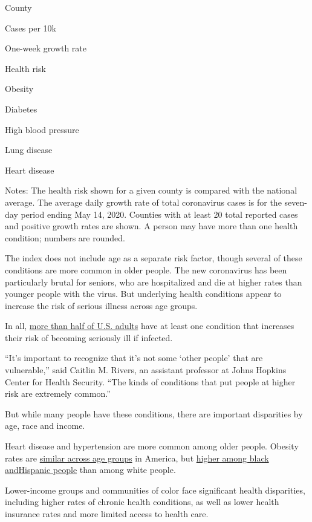 County

Cases per 10k

One-week growth rate

Health risk

Obesity

Diabetes

High blood pressure

Lung disease

Heart disease

Notes: The health risk shown for a given county is compared with the
national average. The average daily growth rate of total coronavirus
cases is for the seven-day period ending May 14, 2020. Counties with at
least 20 total reported cases and positive growth rates are shown. A
person may have more than one health condition; numbers are rounded.

The index does not include age as a separate risk factor, though several
of these conditions are more common in older people. The new coronavirus
has been particularly brutal for seniors, who are hospitalized and die
at higher rates than younger people with the virus. But underlying
health conditions appear to increase the risk of serious illness across
age groups.

In all,
\href{https://www.medrxiv.org/content/10.1101/2020.05.02.20088781v1}{m}\href{https://www.medrxiv.org/content/10.1101/2020.05.02.20088781v1}{ore
than half
o}\href{https://www.medrxiv.org/content/10.1101/2020.05.02.20088781v1}{f
U.S. adults} have at least one condition that increases their risk of
becoming seriously ill if infected.

``It's important to recognize that it's not some `other people' that are
vulnerable,'' said Caitlin M. Rivers, an assistant professor at Johns
Hopkins Center for Health Security. ``The kinds of conditions that put
people at higher risk are extremely common.''

But while many people have these conditions, there are important
disparities by age, race and income.

Heart disease and hypertension are more common among older people.
Obesity rates are
\href{https://www.cdc.gov/nchs/data/databriefs/db288.pdf}{similar across
age groups} in America, but
\href{https://www.cdc.gov/pcd/issues/2019/18_0579.htm}{higher among
black
and}\href{https://www.cdc.gov/pcd/issues/2019/18_0579.htm}{Hispanic
people} than among white people.

Lower-income groups and communities of color face significant health
disparities, including higher rates of chronic health conditions, as
well as lower health insurance rates and more limited access to health
care.

